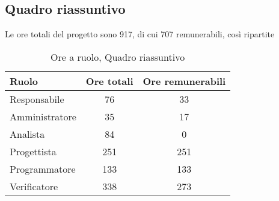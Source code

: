 \subsection{Quadro riassuntivo}
Le ore totali del progetto sono 917, di cui 707 remunerabili, così ripartite
\begin{table}[H]
	\begin{center}
		\begin{tabular}{|l|c|c|}
			\hline
			\textbf{Ruolo}	& \textbf{Ore totali} & \textbf{Ore remunerabili} \\
			\hline
			Responsabile	&	76	&	33	\\
			\hline
			Amministratore	&	35	&	17	\\
			\hline
			Analista		&	84	&	0	\\
			\hline
			Progettista		&	251	&	251	\\
			\hline
			Programmatore	&	133	&	133	\\
			\hline
			Verificatore	&	338	&	273	\\
			\hline
		\end{tabular}
	\end{center}
	\caption{Ore a ruolo, Quadro riassuntivo}
\end{table}
